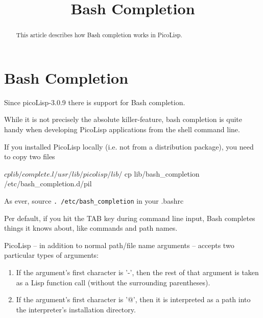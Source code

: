 \title{Bash Completion}

\maketitle





% 

\begin{abstract}
This article describes how Bash completion works in PicoLisp.   
\end{abstract}

\section{Bash Completion}
\label{sec:bash-bash-completion}

Since picoLisp-3.0.9 there is support for Bash completion.

While it is not precisely the absolute killer-feature, bash completion is quite
handy when developing PicoLisp applications from the shell command line.

If you installed PicoLisp locally (i.e. not from a distribution package), you
need to copy two files
\begin{wideverbatim}
   $ cp lib/complete.l /usr/lib/picolisp/lib/
   $ cp lib/bash_completion /etc/bash_completion.d/pil
\end{wideverbatim}

As ever, source \texttt{. /etc/bash\_completion} in your .bashrc


Per default, if you hit the TAB key during command line input, Bash completes
things it knows about, like commands and path names.

PicoLisp -- in addition to normal path/file name arguments -- accepts two
particular types of arguments:
\begin{enumerate}
   \item If the argument's first character is '-', then the rest of that argument is
   taken as a Lisp function call (without the surrounding parentheses).
   \item If the argument's first character is '@', then it is interpreted as a path
   into the interpreter's installation directory.
\end{enumerate}

